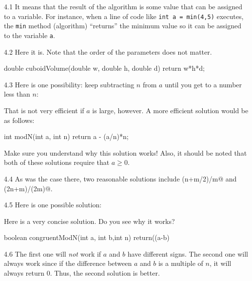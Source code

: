 \begin{RequAnswer}{4.1}
It means that the result of the algorithm is some value that can be assigned to a variable.
For instance, when a line of code like \verb+int a = min(4,5)+ executes,
the \verb+min+ method (algorithm) ``returns'' the minimum value so it can be assigned to
the variable \verb+a+.
\end{RequAnswer}
\begin{RequAnswer}{4.2}
Here it is. Note that the order of the parameters does not matter.
\begin{code}
double cuboidVolume(double w, double h, double d) {
    return w*h*d;
}
\end{code}
\end{RequAnswer}
\begin{RequAnswer}{4.3}
Here is one possibility: keep subtracting $n$ from $a$
until you get to a number less than $n$:
\begin{code}
int modN(int a, int n) {
    while(a>=n) {
        a=a-n;
    return a;
}
\end{code}
That is not very efficient if $a$ is large, however.
A more efficient solution would be as follows:
\begin{code}
int modN(int a, int n) {
    return a - (a/n)*n;
}
\end{code}
Make sure you understand why this solution works!
Also, it should be noted that both of these solutions require that $a\geq 0$.
\end{RequAnswer}
\begin{RequAnswer}{4.4}
As was the case there,
two reasonable solutions include \verb@(n+m/2)/m@ and \verb@(2n+m)/(2m)@.
\end{RequAnswer}
\begin{RequAnswer}{4.5}
Here is one possible solution:
Here is a very concise solution. Do you see why it works?
\begin{code}
boolean congruentModN(int a, int b,int n) {
    return((a-b)%
}
\end{code}
\end{RequAnswer}
\begin{RequAnswer}{4.6}
The first one will {\em not} work if $a$ and $b$ have different signs.
The second one will always work since if the difference between
$a$ and $b$ is a multiple of $n$, it will always return $0$.
Thus, the second solution is better.
\end{RequAnswer}
